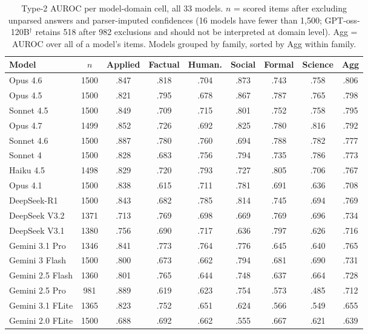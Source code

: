 \begin{table}[!htbp]
\centering
\caption{Type-2 AUROC per model-domain cell, all 33 models. $n$ = scored items after excluding unparsed answers and parser-imputed confidences (16 models have fewer than 1{,}500; GPT-oss-120B$^\dagger$ retains 518 after 982 exclusions and should not be interpreted at domain level). Agg = AUROC over all of a model's items. Models grouped by family, sorted by Agg within family.}
\label{tab:matrix}
\small
\begin{tabular}{lcccccccc}
\toprule
\textbf{Model} & \textbf{$n$} & \textbf{Applied} & \textbf{Factual} & \textbf{Human.} & \textbf{Social} & \textbf{Formal} & \textbf{Science} & \textbf{Agg} \\
\midrule
Opus 4.6 & 1500 & .847 & .818 & .704 & .873 & .743 & .758 & .806 \\
Opus 4.5 & 1500 & .821 & .795 & .678 & .867 & .787 & .765 & .798 \\
Sonnet 4.5 & 1500 & .849 & .709 & .715 & .801 & .752 & .758 & .795 \\
Opus 4.7 & 1499 & .852 & .726 & .692 & .825 & .780 & .816 & .792 \\
Sonnet 4.6 & 1500 & .887 & .780 & .760 & .694 & .788 & .782 & .777 \\
Sonnet 4 & 1500 & .828 & .683 & .756 & .794 & .735 & .786 & .773 \\
Haiku 4.5 & 1498 & .829 & .720 & .793 & .727 & .805 & .706 & .767 \\
Opus 4.1 & 1500 & .838 & .615 & .711 & .781 & .691 & .636 & .708 \\
\midrule
DeepSeek-R1 & 1500 & .843 & .682 & .785 & .814 & .745 & .694 & .769 \\
DeepSeek V3.2 & 1371 & .713 & .769 & .698 & .669 & .769 & .696 & .734 \\
DeepSeek V3.1 & 1380 & .756 & .690 & .717 & .636 & .797 & .626 & .716 \\
\midrule
Gemini 3.1 Pro & 1346 & .841 & .773 & .764 & .776 & .645 & .640 & .765 \\
Gemini 3 Flash & 1500 & .800 & .673 & .662 & .794 & .681 & .690 & .731 \\
Gemini 2.5 Flash & 1360 & .801 & .765 & .644 & .748 & .637 & .664 & .728 \\
Gemini 2.5 Pro & 981 & .889 & .619 & .623 & .754 & .573 & .485 & .712 \\
Gemini 3.1 FLite & 1365 & .823 & .752 & .651 & .624 & .566 & .549 & .655 \\
Gemini 2.0 FLite & 1500 & .688 & .692 & .662 & .555 & .667 & .621 & .639 \\

\end{tabular}
\end{table}
